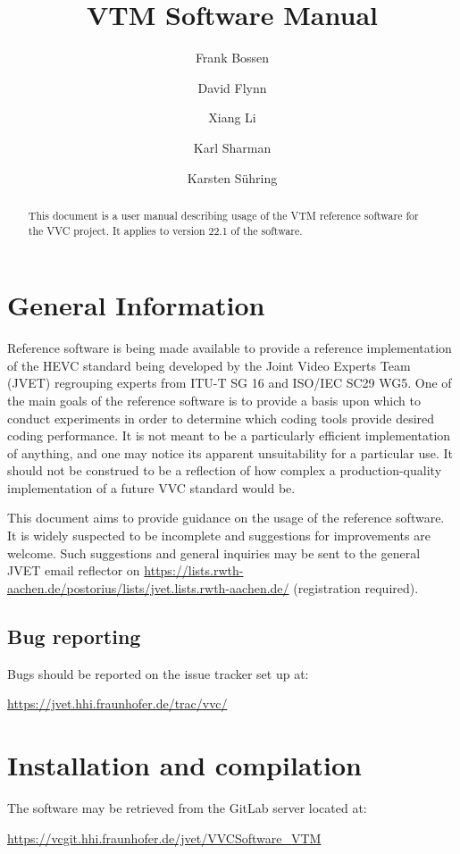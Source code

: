 \documentclass[a4paper,11pt]{jvetdoc}
\title{VTM Software Manual}
\author{%
	Frank Bossen
	\email{frank@bossentech.com}
	\and
	David Flynn
	\and
	Xiang Li
	\email{xlxiangli@google.com}
	\and
	Karl Sharman
	\email{karl.sharman@eu.sony.com}
	\and
	Karsten S\"uhring
	\email{karsten.suehring@hhi.fraunhofer.de}
}
\begin{document}
\maketitle
\begin{abstract}
This document is a user manual describing usage of the VTM reference software
for the VVC project. It applies to version 22.1 of the software.
\end{abstract}

\tableofcontents
\listoftables


\section{General Information}
Reference software is being made available to provide a reference
implementation of the HEVC standard being developed by the Joint 
Video Experts Team (JVET) regrouping experts from
ITU-T SG 16 and ISO/IEC SC29 WG5. One of the main goals of the
reference software is to provide a basis upon which to conduct
experiments in order to determine which coding tools provide desired
coding performance. It is not meant to be a particularly efficient
implementation of anything, and one may notice its apparent
unsuitability for a particular use. It should not be construed to be a
reflection of how complex a production-quality implementation of a
future VVC standard would be.

This document aims to provide guidance on the usage of the reference
software. It is widely suspected to be incomplete and suggestions for
improvements are welcome. Such suggestions and general inquiries may be
sent to the general JVET email reflector on
\url{https://lists.rwth-aachen.de/postorius/lists/jvet.lists.rwth-aachen.de/} 
(registration required).

\subsection*{Bug reporting}
Bugs should be reported on the issue tracker set up at:

\url{https://jvet.hhi.fraunhofer.de/trac/vvc/}

\section{Installation and compilation}
The software may be retrieved from the GitLab server located at:

\url{https://vcgit.hhi.fraunhofer.de/jvet/VVCSoftware_VTM}
\end{document}
